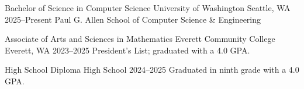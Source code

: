 
\begin{cventries}
  \cventry
    {Bachelor of Science in Computer Science}
    {University of Washington}
    {Seattle, WA}
    {2025--Present}
    {{\upshape Paul G. Allen School of Computer Science \& Engineering}}

  \cventry
    {Associate of Arts and Sciences in Mathematics}
    {Everett Community College}
    {Everett, WA}
    {2023--2025}
    {{\upshape President's List; graduated with a 4.0 GPA.}}

  \cventry
    {High School Diploma}
    {High School}
    {}
    {2024--2025}
    {{\upshape Graduated in ninth grade with a 4.0 GPA.}}
\end{cventries}
